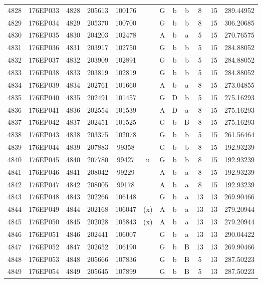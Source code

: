 \begin{tabular}{|*{12}{c|}}
4828 & 176EP033 & 4828 & 205613 & 100176 &  & G & b & b & 8 & 15 & 289.44952 \\ 
4829 & 176EP034 & 4829 & 205370 & 100700 &  & G & b & b & 8 & 15 & 306.20685 \\ 
4830 & 176EP035 & 4830 & 204203 & 102478 &  & A & b & a & 5 & 15 & 270.76575 \\ 
4831 & 176EP036 & 4831 & 203917 & 102750 &  & G & b & b & 5 & 15 & 284.88052 \\ 
4832 & 176EP037 & 4832 & 203909 & 102891 &  & G & b & b & 5 & 15 & 284.88052 \\ 
4833 & 176EP038 & 4833 & 203819 & 102819 &  & G & b & b & 5 & 15 & 284.88052 \\ 
4834 & 176EP039 & 4834 & 202761 & 101660 &  & A & b & a & 8 & 15 & 273.04855 \\ 
4835 & 176EP040 & 4835 & 202491 & 101457 &  & G & D & b & 5 & 15 & 275.16293 \\ 
4836 & 176EP041 & 4836 & 202554 & 101539 &  & A & D & a & 8 & 15 & 275.16293 \\ 
4837 & 176EP042 & 4837 & 202451 & 101525 &  & G & b & B & 8 & 15 & 275.16293 \\ 
4838 & 176EP043 & 4838 & 203375 & 102078 &  & G & b & b & 5 & 15 & 261.56464 \\ 
4839 & 176EP044 & 4839 & 207883 & 99358 &  & G & b & b & 8 & 15 & 192.93239 \\ 
4840 & 176EP045 & 4840 & 207780 & 99427 & u & G & b & b & 8 & 15 & 192.93239 \\ 
4841 & 176EP046 & 4841 & 208042 & 99229 &  & A & b & a & 8 & 15 & 192.93239 \\ 
4842 & 176EP047 & 4842 & 208005 & 99178 &  & A & b & a & 8 & 15 & 192.93239 \\ 
4843 & 176EP048 & 4843 & 202266 & 106148 &  & G & b & a & 13 & 13 & 269.90466 \\ 
4844 & 176EP049 & 4844 & 202168 & 106047 & (x) & A & b & a & 13 & 13 & 279.20944 \\ 
4845 & 176EP050 & 4845 & 202028 & 105843 & (x) & A & b & a & 13 & 13 & 279.20944 \\ 
4846 & 176EP051 & 4846 & 202441 & 106007 &  & G & b & a & 13 & 13 & 290.04422 \\ 
4847 & 176EP052 & 4847 & 202652 & 106190 &  & G & b & B & 13 & 13 & 269.90466 \\ 
4848 & 176EP053 & 4848 & 205666 & 107836 &  & G & b & B & 5 & 13 & 287.50223 \\ 
4849 & 176EP054 & 4849 & 205645 & 107899 &  & G & b & B & 5 & 13 & 287.50223 \\ 

\end{tabular}
